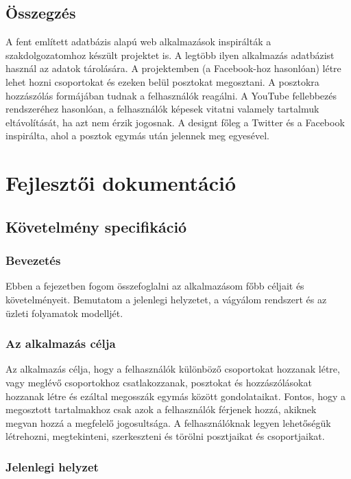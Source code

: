 \documentclass[
]{thesis-ekf}
\theoremstyle{definition}
\theoremstyle{remark}
\begin{document}
\section{Összegzés}

A fent említett adatbázis alapú web alkalmazások inspirálták a szakdolgozatomhoz készült projektet is. A legtöbb ilyen alkalmazás adatbázist használ az adatok tárolására. A projektemben (a Facebook-hoz hasonlóan) létre lehet hozni csoportokat és ezeken belül posztokat megosztani. A posztokra hozzászólás formájában tudnak a felhasználók reagálni. A YouTube fellebbezés rendszeréhez hasonlóan, a felhasználók képesek vitatni valamely tartalmuk eltávolítását, ha azt nem érzik jogosnak. A designt főleg a Twitter és a Facebook inspirálta, ahol a posztok egymás után jelennek meg egyesével.

\chapter{Fejlesztői dokumentáció}
\section{Követelmény specifikáció}
\subsection{Bevezetés}

Ebben a fejezetben fogom összefoglalni az alkalmazásom főbb céljait és követelményeit. Bemutatom a jelenlegi helyzetet, a vágyálom rendszert és az üzleti folyamatok modelljét.

\subsection{Az alkalmazás célja}

Az alkalmazás célja, hogy a felhasználók különböző csoportokat hozzanak létre, vagy meglévő csoportokhoz csatlakozzanak, posztokat és hozzászólásokat hozzanak létre és ezáltal megosszák egymás között gondolataikat. Fontos, hogy a megosztott tartalmakhoz csak azok a felhasználók férjenek hozzá, akiknek megvan hozzá a megfelelő jogosultsága. A felhasználóknak legyen lehetőségük létrehozni, megtekinteni, szerkeszteni és törölni posztjaikat és csoportjaikat. 

\subsection{Jelenlegi helyzet}
\end{document}
